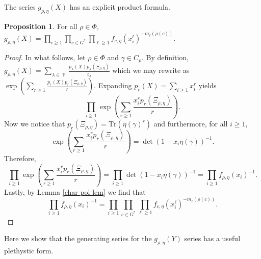 \documentclass[12pt,reqno]{amsart}
\theoremstyle{definition}
\newtheorem{prop}[thm]{Proposition}
\DeclareMathOperator{\Par}{\mathbb{Y}}
\begin{document}
The series $g_{\rho,\eta}(X)$ has an explicit product formula.

\begin{prop}\label{sub kernel prop}
For all $\rho \in \Phi,$
    $g_{\rho,\eta}(X) = \prod_{i \geq 1} \prod_{c \in G^*} \prod_{\ell \geq 1} f_{c,\eta}(x_i^{\ell})^{-m_{\ell}(\rho(c))}.$
\end{prop}
\begin{proof}
 In what follows, let $\rho \in \Phi$ and $\gamma \in C_{\rho}$. By definition, $g_{\rho,\eta}(X) = \sum_{\lambda \in \Par} \frac{p_{\lambda}(X)p_{\lambda}(\Xi_{\rho,\eta})}{z_{\lambda}}$ which we may rewrite as $\exp\left( \sum_{r \geq 1} \frac{p_{r}(X)p_{r}(\Xi_{\rho,\eta})}{r} \right).$ Expanding $p_r(X) = \sum_{i\geq 1}x_i^r$ yields
    $$\prod_{i \geq 1}\exp\left( \sum_{r \geq 1} \frac{x_i^{r}p_{r}(\Xi_{\rho,\eta})}{r}  \right).$$ Now we notice that $p_r(\Xi_{\rho,\eta}) = \mathrm{Tr}(\eta(\gamma)^r)$ and furthermore, for all $i \geq 1,$
    $$\exp\left( \sum_{r \geq 1} \frac{x_i^{r}p_{r}(\Xi_{\rho,\eta})}{r}  \right) = \det(1-x_i \eta(\gamma))^{-1}.$$ Therefore, 
    $$\prod_{i \geq 1}\exp\left( \sum_{r \geq 1} \frac{x_i^{r}p_{r}(\Xi_{\rho,\eta})}{r}  \right) = \prod_{i \geq 1} \det(1-x_i \eta(\gamma))^{-1} = \prod_{i \geq 1} f_{\rho,\eta}(x_i)^{-1}.$$ Lastly, by Lemma \ref{char pol lem} we find that 
    $$\prod_{i \geq 1} f_{\rho,\eta}(x_i)^{-1} = \prod_{i \geq 1} \prod_{c \in G^*} \prod_{\ell \geq 1} f_{c,\eta}(x_i^{\ell})^{-m_{\ell}(\rho(c))}.$$
\end{proof}

Here we show that the generating series for the $g_{\rho,\eta}(Y)$ series has a useful plethystic form.
\end{document}

